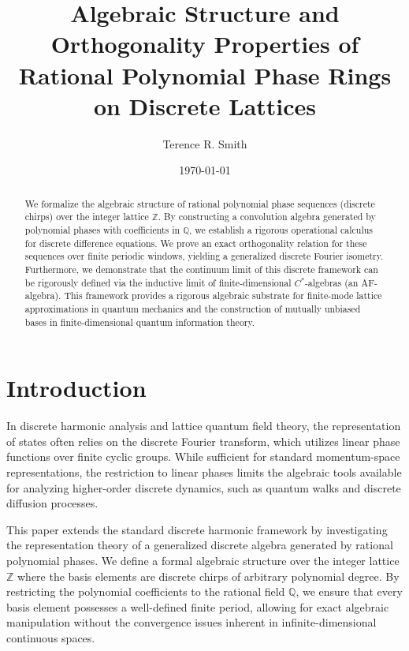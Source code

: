 \documentclass[11pt,a4paper]{article}
\title{Algebraic Structure and Orthogonality Properties of Rational Polynomial Phase Rings on Discrete Lattices}
\author{Terence R. Smith}
\date{\today}
\begin{document}
 
\maketitle 

\begin{abstract} 
We formalize the algebraic structure of rational polynomial phase sequences (discrete chirps) over the integer lattice $\mathbb{Z}$. By constructing a convolution algebra generated by polynomial phases with coefficients in $\mathbb{Q}$, we establish a rigorous operational calculus for discrete difference equations. We prove an exact orthogonality relation for these sequences over finite periodic windows, yielding a generalized discrete Fourier isometry. Furthermore, we demonstrate that the continuum limit of this discrete framework can be rigorously defined via the inductive limit of finite-dimensional $C^*$-algebras (an AF-algebra). This framework provides a rigorous algebraic substrate for finite-mode lattice approximations in quantum mechanics and the construction of mutually unbiased bases in finite-dimensional quantum information theory.
\end{abstract} 







\section{Introduction} 
In discrete harmonic analysis and lattice quantum field theory, the representation of states often relies on the discrete Fourier transform, which utilizes linear phase functions over finite cyclic groups. While sufficient for standard momentum-space representations, the restriction to linear phases limits the algebraic tools available for analyzing higher-order discrete dynamics, such as quantum walks and discrete diffusion processes.

This paper extends the standard discrete harmonic framework by investigating the representation theory of a generalized discrete algebra generated by rational polynomial phases. We define a formal algebraic structure over the integer lattice $\mathbb{Z}$ where the basis elements are discrete chirps of arbitrary polynomial degree. By restricting the polynomial coefficients to the rational field $\mathbb{Q}$, we ensure that every basis element possesses a well-defined finite period, allowing for exact algebraic manipulation without the convergence issues inherent in infinite-dimensional continuous spaces.
\end{document}
